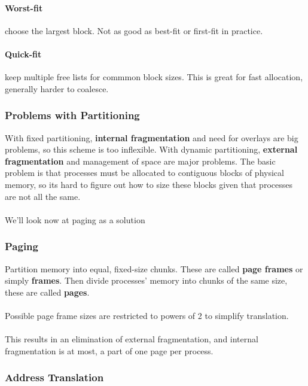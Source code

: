 \documentclass{article}
\begin{document}
\paragraph{Worst-fit} choose the largest block. Not as good as best-fit or first-fit in practice.
\paragraph{Quick-fit} keep multiple free lists for commmon block sizes. This is great for fast allocation, generally harder to coalesce.

\subsubsection{Problems with Partitioning}

With fixed partitioning, \textbf{internal fragmentation} and need for overlays are big problems, so this scheme is too inflexible. With dynamic partitioning, \textbf{external fragmentation} and management of space are major problems. The basic problem is that processes must be allocated to contiguous blocks of physical memory, so its hard to figure out how to size these blocks given that processes are not all the same.\\
\\
We'll look now at paging as a solution

\subsubsection{Paging}

Partition memory into equal, fixed-size chunks. These are called \textbf{page frames} or simply \textbf{frames}. Then divide processes' memory into chunks of the same size, these are called \textbf{pages}.\\
\\
Possible page frame sizes are restricted to powers of 2 to simplify translation.\\
\\
This results in an elimination of external fragmentation, and internal fragmentation is at most, a part of one page per process.

\subsubsection{Address Translation}
\end{document}
